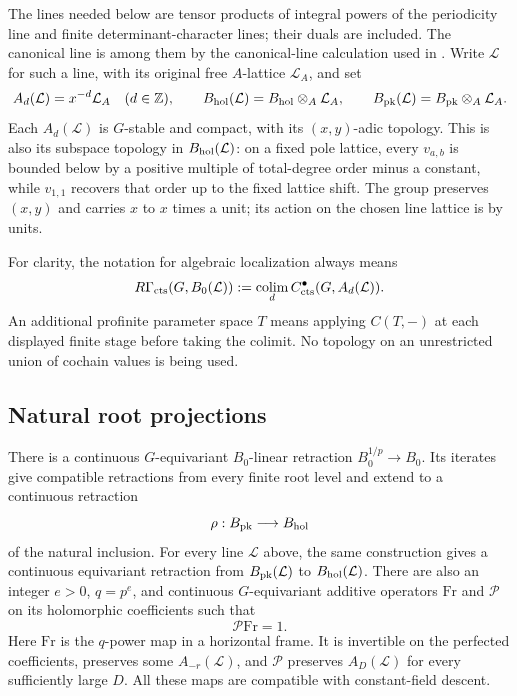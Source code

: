 The lines needed below are tensor products of integral powers of the
periodicity line and finite determinant-character lines; their duals
are included.  The canonical line is among them by the
canonical-line calculation used in .
Write $\mathcal L$ for such a line, with its original free
$A$-lattice $\mathcal L_A$, and set
\[
 A_d(\mathcal L)=x^{-d}\mathcal L_A\quad(d\in\mathbb Z),
 \qquad B_{\mathrm{hol}}(\mathcal L)=B_{\mathrm{hol}}\otimes_A\mathcal L_A,
 \qquad B_{\mathrm{pk}}(\mathcal L)=B_{\mathrm{pk}}\otimes_A\mathcal L_A.
\]
Each $A_d(\mathcal L)$ is $G$-stable and compact, with its
$(x,y)$-adic topology.  This is also its subspace topology in
$B_{\mathrm{hol}}(\mathcal L)$: on a fixed pole lattice, every $v_{a,b}$
is bounded below by a positive multiple of total-degree order minus a
constant, while $v_{1,1}$ recovers that order up to the fixed lattice
shift.  The group preserves $(x,y)$ and carries $x$ to $x$ times a
unit; its action on the chosen line lattice is by units.

For clarity, the notation for algebraic localization always means
\begin{equation}\label{h3:ord:cochain-colimit}
 R\Gamma_{\mathrm{cts}}(G,B_0(\mathcal L))
   :=\operatorname*{colim}_d C^\bullet_{\mathrm{cts}}(G,A_d(\mathcal L)).
\end{equation}
An additional profinite parameter space $T$ means applying
$C(T,-)$ at each displayed finite stage before taking the colimit.
No topology on an unrestricted union of cochain values is being used.

\subsection{Natural root projections}

\begin{lemma}\label{h3:ord:root-retractions}
There is a continuous $G$-equivariant $B_0$-linear retraction
$B_0^{1/p}\to B_0$.  Its iterates give compatible retractions
from every finite root level and extend to a continuous retraction
\[
 \rho:B_{\mathrm{pk}}\longrightarrow B_{\mathrm{hol}}
\]
of the natural inclusion.  For every line $\mathcal L$ above, the same
construction gives a continuous equivariant retraction from
$B_{\mathrm{pk}}(\mathcal L)$ to $B_{\mathrm{hol}}(\mathcal L)$.
There are also an integer $e>0$, $q=p^e$, and continuous
$G$-equivariant additive
operators $\mathrm{Fr}$ and $\mathcal P$ on its holomorphic
coefficients such that
\begin{equation}\label{h3:ord:retraction-identity}
 \mathcal P\mathrm{Fr}=1.
\end{equation}
Here $\mathrm{Fr}$ is the $q$-power map in a horizontal frame.
It is invertible on the perfected coefficients, preserves some
$A_{-r}(\mathcal L)$, and $\mathcal P$ preserves $A_D(\mathcal L)$
for every sufficiently large $D$.
All these maps are compatible with constant-field descent.
\end{lemma}

